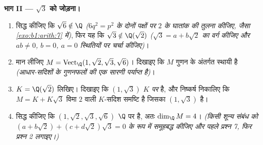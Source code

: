 \begin{problem}
\medskip \noindent\textbf{भाग II --- $\sqrt3$ को जोड़ना।}
\begin{enumerate}[resume]
  \item सिद्ध कीजिए कि $\sqrt6 \notin \Q$ \emph{($6q^2 = p^2$ के दोनों
  पक्षों पर $2$ के घातांक की तुलना कीजिए, जैसा \cref{exo:b1:arith:7} में)},
  फिर यह कि $\sqrt3 \notin \Q(\sqrt2)$ \emph{($\sqrt3 = a + b\sqrt2$ का वर्ग
  कीजिए और $ab \neq 0$, $b = 0$, $a = 0$ स्थितियों पर चर्चा कीजिए)}।
  \item मान लीजिए $M = \operatorname{Vect}_\Q(1, \sqrt2, \sqrt3, \sqrt6)$।
  दिखाइए कि $M$ गुणन के अंतर्गत स्थायी है \emph{(आधार-सदिशों के गुणनफलों की
  एक सारणी पर्याप्त है)}।
  \item $K = \Q(\sqrt2)$ लिखिए। दिखाइए कि $(1, \sqrt3)$ \emph{ $K$
  पर}  है, और निष्कर्ष निकालिए कि $M = K + K\sqrt3$ विमा $2$ वाली
  $K$-सदिश समष्टि है जिसका  $(1, \sqrt3)$ है।
  \item सिद्ध कीजिए कि $(1, \sqrt2, \sqrt3, \sqrt6)$ $\Q$ पर  है,
  अतः $\dim_\Q M = 4$। \emph{(किसी शून्य संबंध को $(a + b\sqrt2) + (c +
  d\sqrt2)\sqrt3 = 0$ के रूप में समूहबद्ध कीजिए और पहले प्रश्न 7, फिर प्रश्न
  2 लगाइए।)}
\end{enumerate}


\end{problem}
